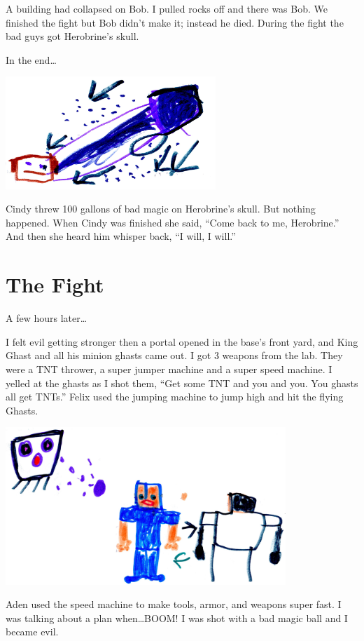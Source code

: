 \documentclass[12pt,twoside]{krantz}
\begin{document}
A building had collapsed on Bob. I pulled rocks off and there was Bob.
We finished the fight but Bob didn't make it; instead he died. During
the fight the bad guys got Herobrine's skull.

In the end\ldots{}

\includegraphics[width=3.125in,height=\textheight]{img/king-ghast/04-jar.jpg}

Cindy threw 100 gallons of bad magic on Herobrine's skull. But nothing
happened. When Cindy was finished she said, ``Come back to me,
Herobrine.'' And then she heard him whisper back, ``I will, I will.''

\hypertarget{the-fight}{%
\section{The Fight}\label{the-fight}}

A few hours later\ldots{}

I felt evil getting stronger then a portal opened in the base's front
yard, and King Ghast and all his minion ghasts came out. I got 3 weapons
from the lab. They were a TNT thrower, a super jumper machine and a
super speed machine. I yelled at the ghasts as I shot them, ``Get some
TNT and you and you. You ghasts all get TNTs.'' Felix used the jumping
machine to jump high and hit the flying Ghasts.

\includegraphics[width=4.16667in,height=\textheight]{img/king-ghast/07-attack.jpg}

Aden used the speed machine to make tools, armor, and weapons super
fast. I was talking about a plan when\ldots{}BOOM! I was shot with a bad
magic ball and I became evil.
\end{document}
